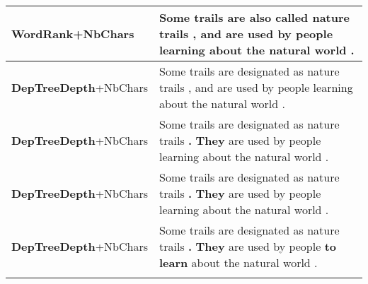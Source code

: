 \documentclass[10pt, a4paper]{article}
\begin{document}
\begin{table*}
{\begin{tabular}{ll}
\textbf{WordRank}\footnotesize{+NbChars} & Some trails are \textbf{also} \textbf{called} nature trails , and are used by people learning about the natural world . \\
\midrule
\textbf{DepTreeDepth}\footnotesize{+NbChars} & Some trails are designated as nature trails , and are used by people learning about the natural world . \\
\textbf{DepTreeDepth}\footnotesize{+NbChars} & Some trails are designated as nature trails \textbf{.} \textbf{They} are used by people learning about the natural world . \\
\textbf{DepTreeDepth}\footnotesize{+NbChars} & Some trails are designated as nature trails \textbf{.} \textbf{They} are used by people learning about the natural world . \\
\textbf{DepTreeDepth}\footnotesize{+NbChars} & Some trails are designated as nature trails \textbf{.} \textbf{They} are used by people \textbf{to} \textbf{learn} about the natural world . \\
\midrule
& \\ \midrule


\end{tabular}}
\end{table*}
\end{document}

